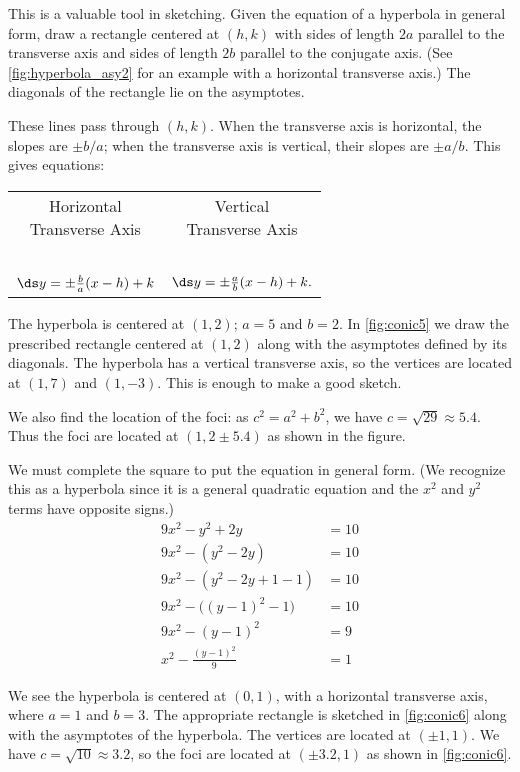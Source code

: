 This is a valuable tool in sketching. Given the equation of a hyperbola in general form, draw a rectangle centered at $(h,k)$ with sides of length $2a$ parallel to the transverse axis and sides of length $2b$ parallel to the conjugate axis. (See \autoref{fig:hyperbola_asy2} for an example with a horizontal transverse axis.) The diagonals of the rectangle lie on the asymptotes. 

These lines pass through $(h,k)$.  When the transverse axis is horizontal, the slopes are $\pm b/a$; when the transverse axis is vertical, their slopes are $\pm a/b$. This gives equations:
\begin{center}
\begin{tabular}{cc}
\parbox{100pt}{\centering Horizontal \\ Transverse Axis} & \parbox{100pt}{\centering Vertical \\ Transverse Axis} \\ \ \\
$\ds y=\pm\frac ba(x-h)+k$  &$\ds  y=\pm\frac ab(x-h)+k.$
\end{tabular}
\end{center}

{The hyperbola is centered at $(1,2)$; $a=5$ and $b=2$.
In \autoref{fig:conic5} we draw the prescribed rectangle centered at $(1,2)$ along with the asymptotes defined by its diagonals. The hyperbola has a vertical transverse axis, so the vertices are located at $(1,7)$ and $(1,-3)$. This is enough to make a good sketch.

We also find the location of the foci: as $c^2= a^2+b^2$, we have $c=\sqrt{29}\approx 5.4$. Thus the foci are located at $(1,2\pm 5.4)$ as shown in the figure.}

{We must complete the square to put the equation in general form. (We recognize this as a hyperbola since it is a general quadratic equation and the $x^2$ and $y^2$ terms have opposite signs.)
\begin{align*}
	9x^2-y^2+2y &=10\\
	9x^2- (y^2-2y) &= 10\\
	9x^2 - (y^2-2y+1-1) &= 10\\
	9x^2 -\big((y-1)^2-1\big) &= 10\\
	9x^2 - (y-1)^2 &= 9\\
	x^2 - \frac{(y-1)^2}{9} &=1
\end{align*}

We see the hyperbola is centered at $(0,1)$, with a horizontal transverse axis, where $a=1$ and $b=3$. The appropriate rectangle is sketched in \autoref{fig:conic6} along with the asymptotes of the hyperbola. The vertices are located at $(\pm 1,1)$. We have $c=\sqrt{10}\approx 3.2$, so the foci are located at $(\pm 3.2,1)$ as shown in \autoref{fig:conic6}.}

